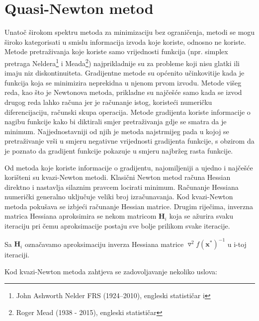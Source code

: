 \documentclass[bosnian,12pt,a4paper]{report}
\begin{document}
	\vspace{1cm}
	\section{Quasi-Newton metod}
	
	\vspace{0.4cm}
	
	\justify
	Unatoč širokom spektru metoda za minimizaciju bez ograničenja, metodi se mogu široko kategorisati u smislu informacija izvoda koje koriste, odnosno ne koriste. Metode pretraživanja koje koriste samo vrijednosti funkcija (npr. simplex pretraga Neldera\footnote{John Ashworth Nelder FRS (1924–2010), engleski statističar i } i Meada\footnote{Roger Mead (1938 - 2015), engleski statističar}) najprikladnije su za probleme koji nisu glatki ili imaju niz diskontinuiteta. Gradijentne metode su općenito učinkovitije kada je funkcija koja se minimizira neprekidna u njenom prvom izvodu. Metode višeg reda, kao što je Newtonova metoda, prikladne su najčešće samo kada se izvod drugog reda lahko računa jer je računanje istog, koristeći numeričku diferencijaciju, računski skupa operacija. Metode gradijenta koriste informacije o nagibu funkcije kako bi diktirali smjer pretraživanja gdje se smatra da je minimum. Najjednostavniji od njih je metoda najstrmijeg pada u kojoj se pretraživanje vrši u smjeru negativne vrijednosti gradijenta funkcije, s obzirom da je poznato da gradijent funkcije pokazuje u smjeru najbržeg rasta funkcije.
	
	\vspace{0.5cm}
	Od metoda koje koriste informacije o gradijentu, najomiljeniji a ujedno i najčešće korišteni su kvazi-Newton metodi. Klasični Newton metod računa Hessian direktno i nastavlja silaznim pravcem locirati minimum. Računanje Hessiana numerički generalno uključuje veliki broj izračunavanja. Kod kvazi-Newton metoda pokušava se izbjeći računanje Hessian matrice. Drugim riječima, inverzna matrica Hessiana aproksimira se nekom matricom $\textbf{H}_i$ koja se ažurira svaku iteraciju pri čemu aproksimacije postaju sve bolje prilikom svake iteracije.   
	
	\vspace{0.5cm}
	Sa $\textbf{H}_i$ označavamo aproksimaciju inverza Hessiana matrice $\triangledown^2f(\textbf{x}^*)^{-1}$ u i-toj iteraciji. 
	
	\newpage
	Kod kvazi-Newton metoda zahtjeva se zadovoljavanje nekoliko uslova:\\
	
\end{document}
